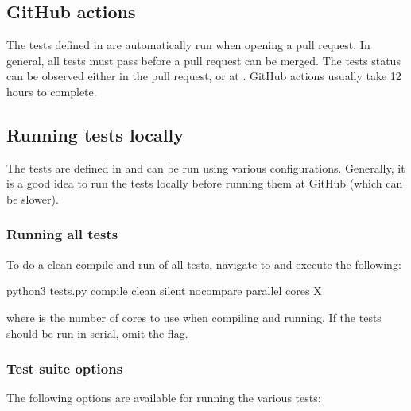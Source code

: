 \documentclass[letterpaper,10pt,english]{sphinxmanual}
\begin{document}
\subsection{GitHub actions}
\label{\detokenize{Contrib/CI:github-actions}}
The tests defined in  are automatically run when opening a pull request.
In general, all tests must pass before a pull request can be merged.
The tests status can be observed either in the pull request, or at .
GitHub actions usually take 1\sphinxhyphen{}2 hours to complete.


\subsection{Running tests locally}
\label{\detokenize{Contrib/CI:running-tests-locally}}
The tests are defined in  and can be run using various configurations.
Generally, it is a good idea to run the tests locally before running them at GitHub (which can be slower).


\subsubsection{Running all tests}
\label{\detokenize{Contrib/CI:running-all-tests}}
To do a clean compile and run of all tests, navigate to  and execute the following:

\begin{sphinxVerbatim}[commandchars=\\\{\},formatcom=\scriptsize]
python3 tests.py \PYGZhy{}\PYGZhy{}compile \PYGZhy{}\PYGZhy{}clean \PYGZhy{}\PYGZhy{}silent \PYGZhy{}\PYGZhy{}no\PYGZus{}compare \PYGZhy{}\PYGZhy{}parallel \PYGZhy{}cores X
\end{sphinxVerbatim}

where  is the number of cores to use when compiling and running.
If the tests should be run in serial, omit the  flag.


\subsubsection{Test suite options}
\label{\detokenize{Contrib/CI:test-suite-options}}
The following options are available for running the various tests:
\end{document}

